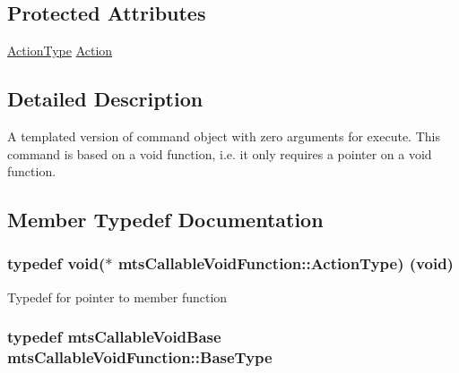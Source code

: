\subsection*{Protected Attributes}
\begin{DoxyCompactItemize}
\item 
\hyperlink{classmts_callable_void_function_a2df84595ba2652ef1d50d1297b023fd5}{Action\+Type} \hyperlink{classmts_callable_void_function_a61118c744dd0d62db9f06ba75fbfe292}{Action}
\end{DoxyCompactItemize}


\subsection{Detailed Description}
A templated version of command object with zero arguments for execute. This command is based on a void function, i.\+e. it only requires a pointer on a void function. 

\subsection{Member Typedef Documentation}
\hypertarget{classmts_callable_void_function_a2df84595ba2652ef1d50d1297b023fd5}{}
\subsubsection[{Action\+Type}]{\setlength{\rightskip}{0pt plus 5cm}typedef void($\ast$ mts\+Callable\+Void\+Function\+::\+Action\+Type) (void)}\label{classmts_callable_void_function_a2df84595ba2652ef1d50d1297b023fd5}
Typedef for pointer to member function \hypertarget{classmts_callable_void_function_a9a675710ec6f9f9e3bd9ed8b22755585}{}
\subsubsection[{Base\+Type}]{\setlength{\rightskip}{0pt plus 5cm}typedef {\bf mts\+Callable\+Void\+Base} {\bf mts\+Callable\+Void\+Function\+::\+Base\+Type}}\label{classmts_callable_void_function_a9a675710ec6f9f9e3bd9ed8b22755585}
\hypertarget{classmts_callable_void_function_a4885dc4c6ac40e229baca8146d328ae1}{}

